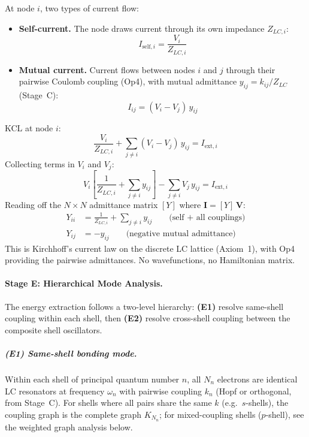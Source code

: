 At node $i$, two types of current flow:
\begin{itemize}
    \item \textbf{Self-current.}  The node draws current
          through its own impedance $Z_{LC,i}$:
          \begin{equation}
              I_{\text{self},i} = \frac{V_i}{Z_{LC,i}}
          \end{equation}
    \item \textbf{Mutual current.}  Current flows between
          nodes $i$ and $j$ through their pairwise Coulomb
          coupling (Op4), with mutual admittance
          $y_{ij} = k_{ij}/Z_{LC}$ (Stage~C):
          \begin{equation}
              I_{ij} = (V_i - V_j)\,y_{ij}
          \end{equation}
\end{itemize}
KCL at node $i$:
\begin{equation}
    \frac{V_i}{Z_{LC,i}}
    + \sum_{j \neq i} (V_i - V_j)\,y_{ij}
    = I_{\text{ext},i}
\end{equation}
Collecting terms in $V_i$ and $V_j$:
\begin{equation}
    V_i \!\left[\frac{1}{Z_{LC,i}}
    + \sum_{j \neq i} y_{ij}\right]
    - \sum_{j \neq i} V_j\,y_{ij}
    = I_{\text{ext},i}
\end{equation}
Reading off the $N \times N$ admittance matrix $[Y]$
where $\mathbf{I} = [Y]\,\mathbf{V}$:
\begin{align}
    Y_{ii} &= \frac{1}{Z_{LC,i}}
    + \sum_{j \neq i} y_{ij}
    \qquad \text{(self + all couplings)} \\
    Y_{ij} &= -y_{ij}
    \qquad \text{(negative mutual admittance)}
\end{align}
This is Kirchhoff's current law on the discrete LC
lattice (Axiom~1), with Op4 providing the pairwise
admittances.  No wavefunctions, no Hamiltonian matrix.

\paragraph{Stage E: Hierarchical Mode Analysis.}

The energy extraction follows a two-level hierarchy:
\textbf{(E1)} resolve same-shell coupling within each shell,
then \textbf{(E2)} resolve cross-shell coupling between
the composite shell oscillators.

\subparagraph{(E1) Same-shell bonding mode.}
Within each shell of principal quantum number $n$, all $N_n$
electrons are identical LC resonators at frequency
$\omega_n$ with pairwise coupling $k_n$ (Hopf or orthogonal,
from Stage~C).  For shells where all pairs share the
same $k$ (e.g.\ $s$-shells), the coupling graph is the
complete graph $K_{N_n}$; for mixed-coupling shells
($p$-shell), see the weighted graph analysis below.

